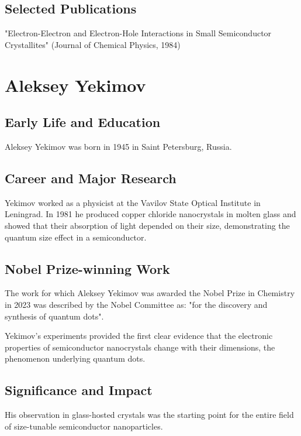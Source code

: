 \subsection*{Selected Publications}

"Electron-Electron and Electron-Hole Interactions in Small Semiconductor Crystallites" (Journal of Chemical Physics, 1984)

\clearpage

\section{Aleksey Yekimov}

\subsection*{Early Life and Education}

Aleksey Yekimov was born in 1945 in Saint Petersburg, Russia.

\subsection*{Career and Major Research}

Yekimov worked as a physicist at the Vavilov State Optical Institute in Leningrad. In 1981 he produced copper chloride nanocrystals in molten glass and showed that their absorption of light depended on their size, demonstrating the quantum size effect in a semiconductor.

\subsection*{Nobel Prize-winning Work}

The work for which Aleksey Yekimov was awarded the Nobel Prize in Chemistry in 2023 was described by the Nobel Committee as: "for the discovery and synthesis of quantum dots".

Yekimov's experiments provided the first clear evidence that the electronic properties of semiconductor nanocrystals change with their dimensions, the phenomenon underlying quantum dots.

\subsection*{Significance and Impact}

His observation in glass-hosted crystals was the starting point for the entire field of size-tunable semiconductor nanoparticles.

